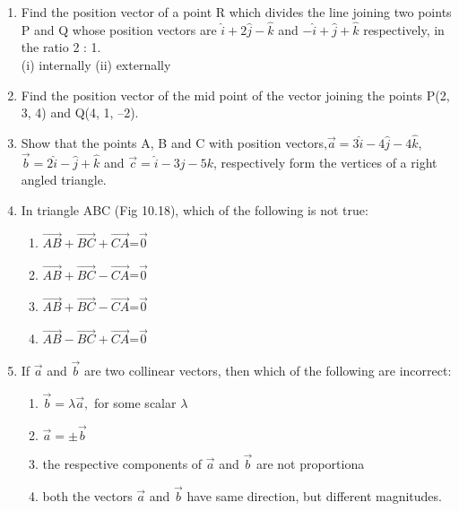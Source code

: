 \documentclass[12pt]{article}
\begin{document}
\begin{enumerate}
\item Find the position vector of a point R which divides the line joining two points P
and Q whose position vectors are $\hat{i}+2\hat{j}-\hat{k}$ and $-\hat{i}+\hat{j}+\hat{k}$ respectively, in the
ratio 2 : 1.
\\(i) internally  \hspace{2cm} (ii) externally
\item Find the position vector of the mid point of the vector joining the points P(2, 3, 4)
and Q(4, 1, –2).
\item Show that the points A, B and C with position vectors,$\vec{a}=3\hat{i}-4\hat{j}-4\hat{k}$,$\vec{b}=2\hat{i}-\hat{j}+\hat{k}$ and $\vec{c}=\hat{i}-3j-5k$, respectively form the vertices of a right angled
triangle.
\item In triangle ABC (Fig 10.18), which of the following is not true:
\begin{enumerate}
         \item $\overrightarrow{AB}+\overrightarrow{BC}+\overrightarrow{CA}$=$\vec{0}$
         \item $\overrightarrow{AB}+\overrightarrow{BC}-\overrightarrow{CA}$=$\vec{0}$
         \item $\overrightarrow{AB}+\overrightarrow{BC}-\overrightarrow{CA}$=$\vec{0}$
         \item $\overrightarrow{AB}-\overrightarrow{BC}+\overrightarrow{CA}$=$\vec{0}$
\end{enumerate}

\item If $\vec{a}$ and $\vec{b}$ are two collinear vectors, then which of the following are incorrect:
\begin{enumerate}
         \item $\vec{b}=\lambda\vec{a},$
 for some scalar $\lambda$
         \item $\vec{a}=\pm\vec{b}$
         \item the respective components of $\vec{a}$ and $\vec{b}$ are not proportiona
         \item both the vectors $\vec{a}$ and $\vec{b}$ have same direction, but different magnitudes.
\end{enumerate}
\end{enumerate}
\end{document}
